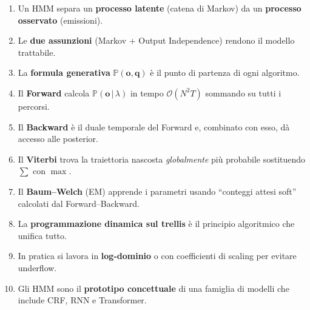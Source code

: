 \documentclass[11pt,a4paper,oneside]{book}
\theoremstyle{plain}
\theoremstyle{definition}
\theoremstyle{remark}
\newcommand{\Prob}{\mathbb{P}}
\newcommand{\hmm}{\lambda}                   %
\newcommand{\Nstates}{N}                     %
\newcommand{\Tlen}{T}                        %
\newcommand{\seqobs}{\mathbf{o}}             %
\newcommand{\seqstates}{\mathbf{q}}          %
\newcommand{\given}{\,\vert\,}
\begin{document}
\begin{tcolorbox}[insightbox,title=I dieci messaggi da portare a casa]
\begin{enumerate}[leftmargin=*]
    \item Un HMM separa un \textbf{processo latente} (catena di
          Markov) da un \textbf{processo osservato} (emissioni).
    \item Le \textbf{due assunzioni} (Markov + Output Independence)
          rendono il modello trattabile.
    \item La \textbf{formula generativa} $\Prob(\seqobs,\seqstates)$
          è il punto di partenza di ogni algoritmo.
    \item Il \textbf{Forward} calcola $\Prob(\seqobs\given\hmm)$ in
          tempo $\mathcal{O}(\Nstates^2\Tlen)$ sommando su tutti i
          percorsi.
    \item Il \textbf{Backward} è il duale temporale del Forward e,
          combinato con esso, dà accesso alle posterior.
    \item Il \textbf{Viterbi} trova la traiettoria nascosta
          \emph{globalmente} più probabile sostituendo $\sum$ con
          $\max$.
    \item Il \textbf{Baum--Welch} (EM) apprende i parametri usando
          ``conteggi attesi soft'' calcolati dal Forward--Backward.
    \item La \textbf{programmazione dinamica sul trellis} è il
          principio algoritmico che unifica tutto.
    \item In pratica si lavora in \textbf{log-dominio} o con
          coefficienti di scaling per evitare underflow.
    \item Gli HMM sono il \textbf{prototipo concettuale} di una
          famiglia di modelli che include CRF, RNN e Transformer.
\end{enumerate}
\end{tcolorbox}
\end{document}
